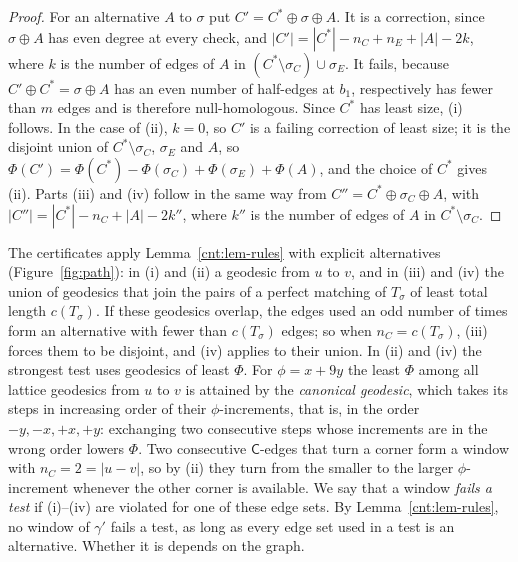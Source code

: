 \documentclass[11pt]{amsart}
\theoremstyle{definition}
\theoremstyle{remark}
\numberwithin{equation}{section}
\begin{document}
\begin{proof}
For an alternative $A$ to $\sigma$ put $C'=C^\ast\oplus\sigma\oplus A$. It is a correction, since $\sigma\oplus A$ has
even degree at every check, and $|C'|=|C^\ast|-n_C+n_E+|A|-2k$, where $k$ is the number of edges of $A$ in
$(C^\ast\setminus\sigma_C)\cup\sigma_E$. It fails, because $C'\oplus C^\ast=\sigma\oplus A$ has an even number of
half-edges at $b_1$, respectively has fewer than $m$ edges and is therefore null-homologous. Since $C^\ast$ has least
size, (i) follows. In the case of (ii), $k=0$, so $C'$ is a failing correction of least size; it is the disjoint union
of $C^\ast\setminus\sigma_C$, $\sigma_E$ and $A$, so $\Phi(C')=\Phi(C^\ast)-\Phi(\sigma_C)+\Phi(\sigma_E)+\Phi(A)$, and
the choice of $C^\ast$ gives (ii). Parts (iii) and (iv) follow in the same way from $C''=C^\ast\oplus\sigma_C\oplus A$,
with $|C''|=|C^\ast|-n_C+|A|-2k''$, where $k''$ is the number of edges of $A$ in $C^\ast\setminus\sigma_C$.
\end{proof}

The certificates apply Lemma~\ref{cnt:lem-rules} with explicit alternatives (Figure~\ref{fig:path}): in (i) and (ii) a geodesic from $u$ to $v$,
and in (iii) and (iv) the union of geodesics that join the pairs of a perfect matching of $T_\sigma$ of least total
length $c(T_\sigma)$. If these geodesics overlap, the edges used an odd number of times form an alternative with fewer
than $c(T_\sigma)$ edges; so when $n_C=c(T_\sigma)$, (iii) forces them to be disjoint, and (iv) applies to their union.
In (ii) and (iv) the strongest test uses geodesics of least $\Phi$.
For $\phi=x+9y$ the least $\Phi$ among all lattice geodesics from $u$ to $v$ is attained by the \emph{canonical
geodesic}, which takes its steps in increasing order of their $\phi$-increments, that is, in the order $-y,-x,+x,+y$:
exchanging two consecutive steps whose increments are in the wrong order lowers $\Phi$. Two consecutive
$\mathsf C$-edges that turn a corner form a window with $n_C=2=|u-v|$, so by (ii) they turn from the smaller to the
larger $\phi$-increment whenever the other corner is available. We say that a window \emph{fails a test} if (i)--(iv)
are violated for one of these edge sets. By Lemma~\ref{cnt:lem-rules}, no window of $\gamma'$ fails a test, as long as
every edge set used in a test is an alternative. Whether it is depends on the graph.
\end{document}

